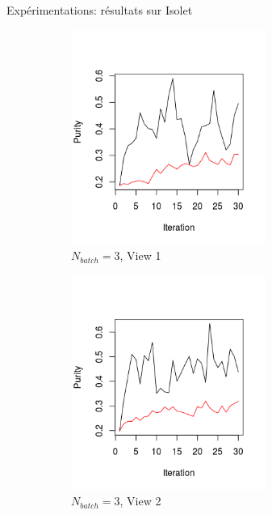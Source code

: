 \documentclass[hyperref={pdfpagelabels=false}]{beamer}
\begin{document}
\begin{frame}{Expérimentations: résultats sur Isolet}
\begin{figure}[!h]
\begin{subfigure}[b]{0.3\textwidth}
                    \centering
                    \includegraphics[width=0.7\textwidth, trim= 0cm 0.5cm 1cm 1.9cm, clip]{img/p1.png}
                    \caption{$N_{batch}=3$, View 1}
                \end{subfigure}
                \begin{subfigure}[b]{0.3\textwidth}
                    \centering
                    \includegraphics[width=0.7\textwidth, trim= 0cm 0.5cm 1cm 2cm, clip]{img/p2.png}
                    \caption{$N_{batch}=3$, View 2}
                \end{subfigure}
                \begin{subfigure}[b]{0.3\textwidth}

\end{subfigure}
\end{figure}
\end{frame}
\end{document}
